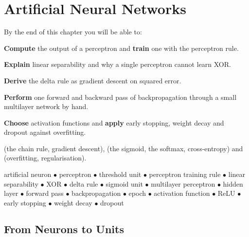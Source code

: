 \chapter{Artificial Neural Networks}\label{ch:ann}

\begin{outcomes}
By the end of this chapter you will be able to:
\begin{tight}
  \item \textbf{Compute} the output of a perceptron and \textbf{train} one with the
        perceptron rule.
  \item \textbf{Explain} linear separability and why a single perceptron cannot
        learn XOR.
  \item \textbf{Derive} the delta rule as gradient descent on squared error.
  \item \textbf{Perform} one forward and backward pass of backpropagation through a
        small multilayer network by hand.
  \item \textbf{Choose} activation functions and \textbf{apply} early stopping,
        weight decay and dropout against overfitting.
\end{tight}
\end{outcomes}

\begin{prereq}
 (the chain rule, gradient descent),  (the sigmoid, the
softmax, cross-entropy) and  (overfitting, regularisation).
\end{prereq}

\begin{keyterms}
artificial neuron $\bullet$ perceptron $\bullet$ threshold unit $\bullet$
perceptron training rule $\bullet$ linear separability $\bullet$ XOR $\bullet$
delta rule $\bullet$ sigmoid unit $\bullet$ multilayer perceptron $\bullet$ hidden
layer $\bullet$ forward pass $\bullet$ backpropagation $\bullet$ epoch $\bullet$
activation function $\bullet$ ReLU $\bullet$ early stopping $\bullet$ weight decay
$\bullet$ dropout
\end{keyterms}

\section{From Neurons to Units}

